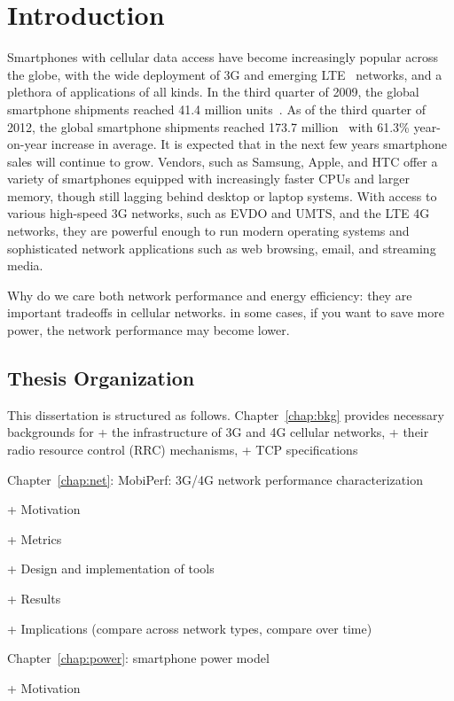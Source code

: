\chapter{Introduction}   \label{chap:intro}

Smartphones with cellular data access have become increasingly popular across the globe, with the wide deployment of 3G and emerging LTE~\cite{3gpp.lte} networks, and a plethora of applications of all kinds. In the third quarter of 2009, the global smartphone shipments reached 41.4 million units~\cite{smartphoneStat}. As of the third quarter of 2012, the global smartphone shipments reached 173.7 million~\cite{smartphoneStat2} with 61.3\% year-on-year increase in average. It is expected that in the next few years smartphone sales will continue to grow.  Vendors, such as Samsung, Apple, and HTC offer a variety of smartphones equipped with increasingly faster CPUs and larger memory, though still lagging behind desktop or laptop systems. With access to various high-speed 3G networks, such as EVDO and UMTS, and the LTE 4G networks, they are powerful enough to run modern operating systems and sophisticated network applications such as web browsing, email, and streaming media. 

Why do we care both network performance and energy efficiency: they are important tradeoffs in cellular networks. in some cases, if you want to save more power, the network performance may become lower.

\section{Thesis Organization}

This dissertation is structured as follows. Chapter~\ref{chap:bkg} provides necessary backgrounds for 
+ the infrastructure of 3G and 4G cellular networks, 
+ their radio resource control (RRC) mechanisms, 
+ TCP specifications

Chapter~\ref{chap:net}: MobiPerf: 3G/4G network performance characterization

	+ Motivation

	+ Metrics

	+ Design and implementation of tools

	+ Results

	+ Implications (compare across network types, compare over time)
	
Chapter~\ref{chap:power}: smartphone power model

	+ Motivation


